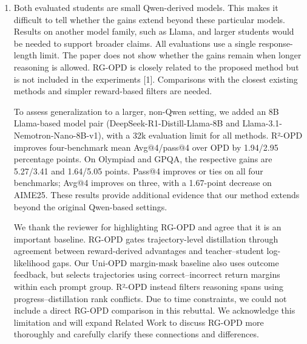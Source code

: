 \begin{enumerate}
\item Both evaluated students are small Qwen-derived models. This makes it difficult to tell whether the gains extend beyond these particular models. Results on another model family, such as Llama, and larger students would be needed to support broader claims. All evaluations use a single response-length limit. The paper does not show whether the gains remain when longer reasoning is allowed. RG-OPD is closely related to the proposed method but is not included in the experiments [1]. Comparisons with the closest existing methods and simpler reward-based filters are needed.
\par{}
\begin{responsebox}[frametitle={Response to W2}]
To assess generalization to a larger, non-Qwen setting, we added an 8B Llama-based model pair (DeepSeek-R1-Distill-Llama-8B and Llama-3.1-Nemotron-Nano-8B-v1), with a 32k evaluation limit for all methods. R²-OPD improves four-benchmark mean Avg@4/pass@4 over OPD by 1.94/2.95 percentage points. On Olympiad and GPQA, the respective gains are 5.27/3.41 and 1.64/5.05 points. Pass@4 improves or ties on all four benchmarks; Avg@4 improves on three, with a 1.67-point decrease on AIME25. These results provide additional evidence that our method extends beyond the original Qwen-based settings.


We thank the reviewer for highlighting RG-OPD and agree that it is an important baseline. RG-OPD gates trajectory-level distillation through agreement between reward-derived advantages and teacher–student log-likelihood gaps. Our Uni-OPD margin-mask baseline also uses outcome feedback, but selects trajectories using correct–incorrect return margins within each prompt group. R²-OPD instead filters reasoning spans using progress–distillation rank conflicts. Due to time constraints, we could not include a direct RG-OPD comparison in this rebuttal. We acknowledge this limitation and will expand Related Work to discuss RG-OPD more thoroughly and carefully clarify these connections and differences.


\end{responsebox}
\end{enumerate}
